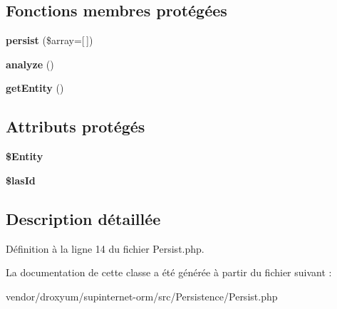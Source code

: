 \subsection*{Fonctions membres protégées}
\begin{DoxyCompactItemize}
\item 
{\bfseries persist} (\$array=\mbox{[}$\,$\mbox{]})\hypertarget{class_o_r_m_1_1_persistence_1_1_persist_a6a03fa7a866b4db6d16a2a3613e49d1b}{}\label{class_o_r_m_1_1_persistence_1_1_persist_a6a03fa7a866b4db6d16a2a3613e49d1b}

\item 
{\bfseries analyze} ()\hypertarget{class_o_r_m_1_1_persistence_1_1_persist_a9290b43f1b62e53c93e5a72c2cc8413f}{}\label{class_o_r_m_1_1_persistence_1_1_persist_a9290b43f1b62e53c93e5a72c2cc8413f}

\item 
{\bfseries get\+Entity} ()\hypertarget{class_o_r_m_1_1_persistence_1_1_persist_a0848c661e55b6027e3794d16cad5d501}{}\label{class_o_r_m_1_1_persistence_1_1_persist_a0848c661e55b6027e3794d16cad5d501}

\end{DoxyCompactItemize}
\subsection*{Attributs protégés}
\begin{DoxyCompactItemize}
\item 
{\bfseries \$\+Entity}\hypertarget{class_o_r_m_1_1_persistence_1_1_persist_aca18b058e8207b5d1deba2d033296001}{}\label{class_o_r_m_1_1_persistence_1_1_persist_aca18b058e8207b5d1deba2d033296001}

\item 
{\bfseries \$las\+Id}\hypertarget{class_o_r_m_1_1_persistence_1_1_persist_a68d1bbe87712798c173de6ba95e13fca}{}\label{class_o_r_m_1_1_persistence_1_1_persist_a68d1bbe87712798c173de6ba95e13fca}

\end{DoxyCompactItemize}


\subsection{Description détaillée}


Définition à la ligne 14 du fichier Persist.\+php.



La documentation de cette classe a été générée à partir du fichier suivant \+:\begin{DoxyCompactItemize}
\item 
vendor/droxyum/supinternet-\/orm/src/\+Persistence/Persist.\+php\end{DoxyCompactItemize}
